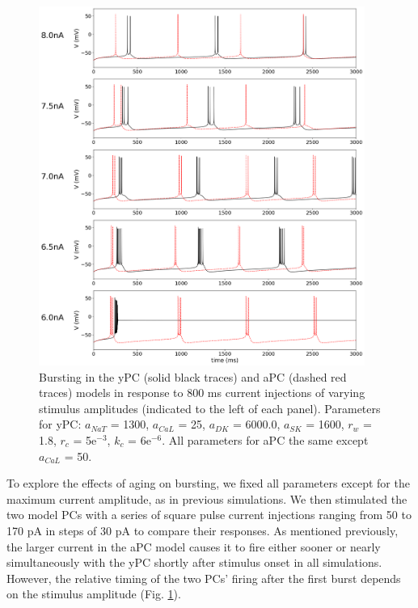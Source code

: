 \documentclass[12pt]{article}
\begin{document}
\begin{figure}[h!]
\centering
\includegraphics[width=0.95\textwidth]{figures/fig4.png}
\caption{Bursting in the yPC (solid black traces) and aPC (dashed red traces) models in response to 800 ms current injections of varying stimulus amplitudes (indicated to the left of each panel). Parameters for yPC: $a_{NaT}$ = 1300, $a_{CaL}$ = 25, $a_{DK}$ = 6000.0, $a_{SK}$ = 1600, $r_{w}$ = 1.8, $r_{c}$ = 5e$^{-3}$, $k_{c}$ = 6e$^{-6}$. All parameters for aPC the same except $a_{CaL}$ = 50.}
\label{fig:burstStims}
\end{figure}

To explore the effects of aging on bursting, we fixed all parameters except for the maximum {\Ca} current amplitude, as in previous simulations. We then stimulated the two model PCs with a series of square pulse current injections ranging from 50 to 170 pA in steps of 30 pA to compare their responses. As mentioned previously, the larger {\Ca} current in the aPC model causes it to fire either sooner or nearly simultaneously with the yPC shortly after stimulus onset in all simulations. However, the relative timing of the two PCs' firing after the first burst depends on the stimulus amplitude (Fig. \ref{fig:burstStims}).
\end{document}
